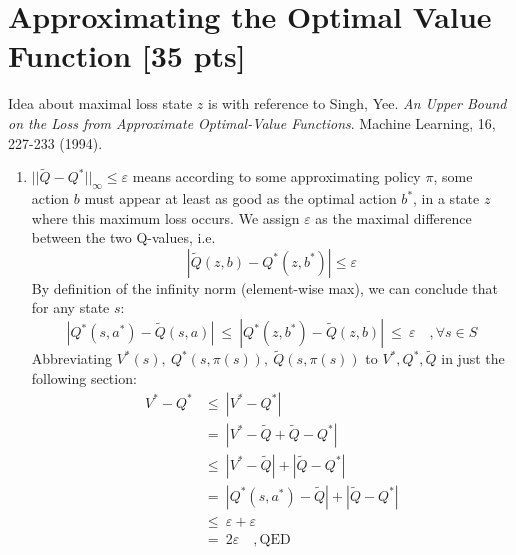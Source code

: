 \documentclass[11pt]{article}
\let\epsilon\varepsilon
\begin{document}
\section{Approximating the Optimal Value Function [35 pts]}

Idea about maximal loss state $z$ is with reference to Singh, Yee. \textit{An Upper Bound on the Loss from Approximate Optimal-Value Functions}. Machine Learning, 16, 227-233 (1994).

\begin{enumerate}[label=(\alph*)]
	
	\item $||\tilde{Q} - Q^*||_\infty \leq \epsilon$ means according to some approximating policy $\pi$, some action $b$ must appear at least as good as the optimal action $b^*$, in a state $z$ where this maximum loss occurs. We assign $\epsilon$ as the maximal difference between the two Q-values, i.e.
	$$ |\tilde{Q}(z, b) - Q^*(z, b^*)| \leq \epsilon$$
	By definition of the infinity norm (element-wise max), we can conclude that for any state $s$:
	$$|Q^*(s,a^*) - \tilde{Q}(s,a)| \ \leq \ |Q^*(z, b^*) - \tilde{Q}(z, b)| \ \leq \ \epsilon \quad, \forall s \in S$$
	Abbreviating $V^*(s), \ Q^*(s,\pi(s)),\ \tilde{Q}(s,\pi(s))$ to $V^*, Q^*, \tilde{Q}$ in just the following section:
	\begin{align*}
	V^*-Q^* &\leq\ |V^*-Q^*| \\ 
	&=\ |V^*-\tilde{Q}+\tilde{Q}-Q^*| \\
	&\leq\ |V^*-\tilde{Q}|+|\tilde{Q}-Q^*| \\
	&=\ |Q^*(s,a^*) - \tilde{Q}| + |\tilde{Q}-Q^*| \\
	&\leq \ \epsilon + \epsilon \\
	&=\ 2\epsilon \quad, \textrm{QED}
	\end{align*}
	

\end{enumerate}
\end{document}
